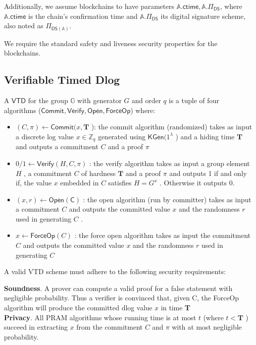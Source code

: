 \documentclass{article}      	%
\begin{document}
Additionally, we assume blockchains to have parameters $\mathbb{A}.\mathsf{ctime}, \mathbb{A}.\Pi_\mathsf{DS}$, where $\mathbb{A}.\mathsf{ctime}$ is the chain's confirmation time and $\mathbb{A}.\Pi_\mathsf{DS}$ its digital signature scheme, also noted as $\Pi_\mathsf{DS(\mathbb{A})}$.

We require the standard safety and liveness security properties for the blockchains.

\subsection{Verifiable Timed Dlog}
A $\mathsf{VTD}$ for the group $\mathbb{G}$ with generator $G$ and order $q$ is a tuple of four algorithms ($\mathsf{Commit}, \mathsf{Verify}, \mathsf{Open}, \mathsf{ForceOp}$) where:
\begin{itemize}
	\item $(C, \pi) \gets \mathsf{Commit}(x, \textbf{T}$ ): the commit algorithm (randomized) takes as input a discrete log value $x \in \mathbb{Z}_q$ generated using $\mathsf{KGen}(1^{\lambda}$ ) and a hiding time $\textbf{T}$ and outputs a commitment $C$ and a proof $\pi$
	\item $0/1 \gets \mathsf{Verify}(H, C, \pi)$ : the verify algorithm takes as input a group element $H$ , a commitment $C$ of hardness $\textbf{T}$ and a proof $\pi$ and outputs 1 if and only if, the value $x$ embedded in $C$ satisfies $H = G^x$ . Otherwise it outputs 0.
	\item $(x, r) \gets \mathsf{Open(C)}$ : the open algorithm (run by committer) takes as input a commitment $C$ and outputs the committed value $x$ and the randomness $r$ used in generating $C$ .
	\item $x \gets \mathsf{ForceOp}(C)$ : the force open algorithm takes as input the commitment $C$ and outputs the committed value $x$ and the randomness $r$ used in generating $C$
\end{itemize}


A valid VTD scheme must adhere to the following security requirements:

\textbf{Soundness}. A prover can compute a valid proof for a false statement with negligible probability. Thus a verifier is convinced that, given C, the ForceOp algorithm will produce the committed dlog value $x$ in time \textbf{T} \\
\textbf{Privacy}. All PRAM algorithms whose running time is at most $t$ (where $t < \textbf{T}$ ) succeed in extracting $x$ from the commitment $C$ and $\pi$ with at most negligible probability. \\
\end{document}
